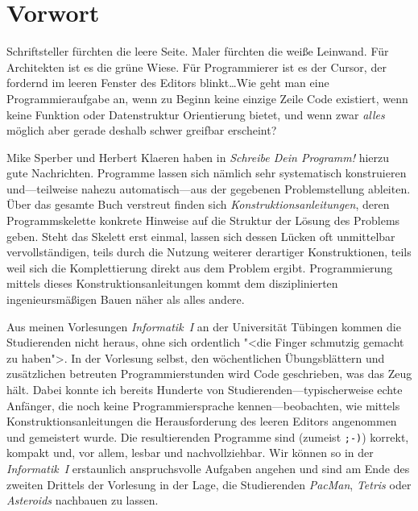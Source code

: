 
\chapter*{Vorwort}
\thispagestyle{empty}


Schriftsteller fürchten die leere Seite.  Maler fürchten die weiße
Leinwand.  Für Architekten ist es die grüne Wiese.  Für Programmierer
ist es der Cursor, der fordernd im leeren Fenster des Editors
blinkt\dots Wie geht man eine Programmieraufgabe an, wenn zu Beginn
keine einzige Zeile Code existiert, wenn keine Funktion oder
Datenstruktur Orientierung bietet, und wenn zwar \emph{alles} möglich
aber gerade deshalb schwer greifbar erscheint?

Mike Sperber und Herbert Klaeren haben in \textit{Schreibe Dein
Programm!} hierzu gute Nachrichten.  Programme lassen sich nämlich sehr
systematisch konstruieren und---teilweise nahezu auto\-ma\-tisch---aus der
gegebenen Problemstellung ableiten.  Über das gesamte Buch verstreut
finden sich \textit{Konstruktionsanleitungen}, deren Programmskelette
konkrete Hinweise auf die Struktur der Lösung des Problems geben.  Steht
das Skelett erst einmal, lassen sich dessen Lücken oft unmittelbar
vervollständigen, teils durch die Nutzung weiterer derartiger
Konstruktionen, teils weil sich die Komplettierung direkt aus dem
Problem ergibt.  Programmierung mittels dieses Konstruktionsanleitungen
kommt dem disziplinierten ingenieursmäßigen Bauen näher als alles
andere.

Aus meinen Vorlesungen \textit{Informatik~I} an der Universität Tübingen
kommen die Studierenden nicht heraus, ohne sich ordentlich "<die Finger
schmutzig gemacht zu haben">.  In der Vorlesung selbst, den
wöchentlichen Übungsblättern und zusätzlichen betreuten
Programmierstunden wird Code geschrieben, was das Zeug hält.  Dabei
konnte ich bereits Hunderte von Studierenden---typischerweise echte
Anfänger, die noch keine Programmiersprache kennen---beobachten, wie
mittels Konstruktionsanleitungen die Herausforderung des leeren Editors
angenommen und gemeistert wurde.  Die resultierenden Programme sind
(zumeist \texttt{;-)}) korrekt, kompakt und, vor allem, lesbar und
nachvollziehbar.  Wir können so in der \textit{Informatik~I} erstaunlich
anspruchsvolle Aufgaben angehen und sind am Ende des zweiten
Drittels der Vorlesung in der Lage, die Studierenden \textit{PacMan},
\textit{Tetris} oder \textit{Asteroids} nachbauen zu lassen.

